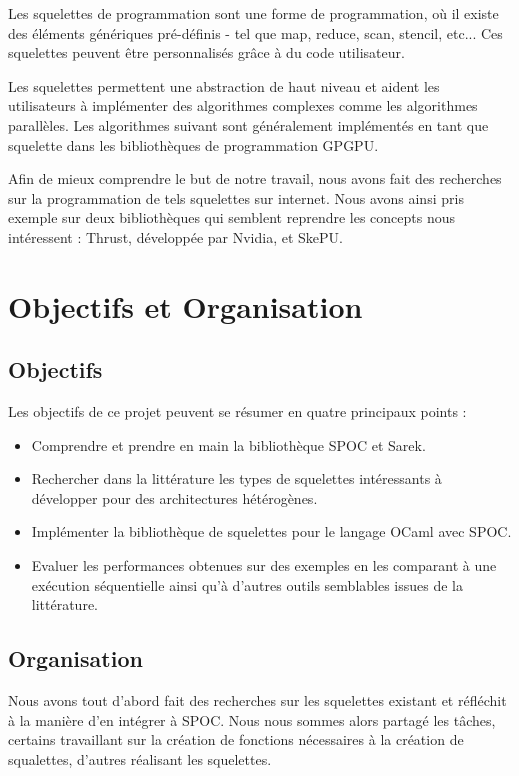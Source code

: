 \documentclass{report}
\begin{document}
Les squelettes de programmation\cite{refSkeleton} sont une forme de programmation, où il existe des éléments génériques pré-définis - tel que map, reduce, scan, stencil, etc... Ces squelettes peuvent être personnalisés grâce à du code utilisateur.\newline

Les squelettes permettent une abstraction de haut niveau et aident les utilisateurs à implémenter des algorithmes complexes comme les algorithmes parallèles. Les algorithmes suivant sont généralement implémentés en tant que squelette dans les bibliothèques de programmation GPGPU.\newline

Afin de mieux comprendre le but de notre travail, nous avons fait des recherches sur la programmation de tels squelettes sur internet. Nous avons ainsi pris exemple sur deux bibliothèques qui semblent reprendre les concepts nous intéressent : Thrust, développée par Nvidia, et SkePU.\newline



\section{Objectifs et Organisation}
\subsection{Objectifs}
Les objectifs de ce projet peuvent se résumer en quatre principaux points :
\begin{itemize}
\item Comprendre et prendre en main la bibliothèque SPOC et Sarek.
\item Rechercher dans la littérature les types de squelettes intéressants à développer  pour des architectures hétérogènes.
\item Implémenter la bibliothèque de squelettes pour le langage OCaml avec SPOC.
\item Evaluer les performances obtenues sur des exemples en les comparant à une exécution séquentielle ainsi qu'à d'autres outils semblables issues de la littérature. 
\end{itemize}

\subsection{Organisation}

Nous avons tout d'abord fait des recherches sur les squelettes existant et réfléchit à la manière d'en intégrer à SPOC.\newline
Nous nous sommes alors partagé les tâches, certains travaillant sur la création de fonctions nécessaires à la création de squalettes, d'autres réalisant les squelettes.\newline
\end{document}
